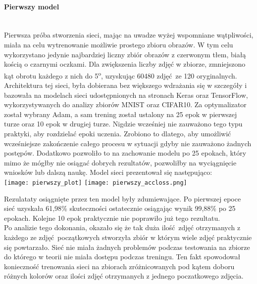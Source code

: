 \paragraph{Pierwszy model} \mbox{}\\
Pierwsza próba stworzenia sieci, mając na uwadze wyżej wspomniane wątpliwości, miała
na celu wytrenowanie możliwie prostego zbioru obrazów. W tym celu wykorzystano jedynie
najbardziej liczny zbiór obrazów z czerwonym tłem, białą kością o czarnymi oczkami. Dla
zwiększenia liczby zdjęć w zbiorze, zmniejszono kąt obrotu każdego z nich do
5\textsuperscript{o}, uzyskując 60480 zdjęć ze 120 oryginalnych.\\
Architektura tej sieci, była dobierana bez większego wdrażania się w szczegóły i
bazowała na modelach sieci udostępnionych na stronach Keras oraz TensorFlow,
wykorzystywanych do analizy zbiorów MNIST oraz CIFAR10. Za optymalizator został wybrany
Adam, a sam trening został ustalony na 25 epok w pierwszej turze oraz 10 epok w drugiej
turze. Nigdzie wcześniej nie zauważono tego typu praktyki, aby rozdzielać epoki uczenia.
Zrobiono to dlatego, aby umożliwić wcześniejsze zakończenie całego procesu w sytuacji
gdyby nie zauważono żadnych postępów. Dodatkowo pozwoliło to na zachowanie modelu
po 25 epokach, który mimo że mógłby nie osiągać dobrych rezultatów, pozwoliłby
na wyciągnięcie wniosków lub dalszą naukę. Model sieci prezentował się następująco:\\
\texttt{[image: pierwszy\_plot]}
\texttt{[image: pierwszy\_accloss.png]}

Rezulataty osiągnięte przez ten model były zdumiewające. Po pierwszej epoce
sieć uzyskała 61,98\% skuteczności ostatecznie osiągając wynik 99,88\% po 25 epokach.
Kolejne 10 epok praktycznie nie poprawiło już tego rezultatu.\\
Po analizie tego dokonania, okazało się że tak duża ilość zdjęć otrzymanych
z każdego ze zdjęć początkowych stworzyła zbiór w którym wiele zdjęć praktycznie się
powtarzało. Sieć nie miała żadnych problemów podczas testowania na zbiorze
do którego w teorii nie miała dostępu podczas treningu. Ten fakt spowodował konieczność
trenowania sieci na zbiorach zróżnicowanych pod kątem doboru różnych kolorów oraz
ilości zdjęć otrzymanych z jednego poczatkowego zdjęcia.

